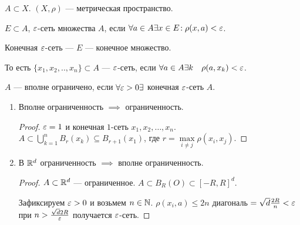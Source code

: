 \begin{definition}
    $A \subset X$.  $(X, \rho)$ --- метрическая пространство.

     $E \subset A$,  $\varepsilon$-сеть множества  $A$, если  $\forall a \in A \exists x \in E\!: \rho(x, a) < \varepsilon$.

     Конечная  $\varepsilon$-сеть ---  $E$ --- конечное множество.

     То есть $\{x_1, x_2,.., x_n\} \subset A$ --- $\varepsilon$-сеть, если  $\forall a \in A \exists k\quad \rho(a, x_k) < \varepsilon$.
\end{definition}
\begin{definition}
    $A$ --- вполне ограничено, если  $\forall \varepsilon > 0 \exists$ конечная $\varepsilon$-сеть  $A$.
\end{definition}

\begin{properties}
    \begin{enumerate}
        \item Вполне ограниченность $\implies$ ограниченность.
             \begin{proof}
                $\varepsilon = 1$ и конечная  $1$-сеть  $x_1, x_2,\ldots,x_n$. $A \subset \bigcup\limits_{k=1}^n B_r(x_k) \subseteq B_{r+1}(x_1)$, где $r = \max\limits_{i \neq j} \rho(x_i, x_j)$.
            \end{proof}
        \item В $\mathbb{R}^d$ ограниченность  $\implies$ вполне ограниченность. 
             \begin{proof}
                $A \subset \mathbb{R}^d$ --- ограниченное.  $A \subset B_R(O) \subset [-R, R]^d$.

                Зафиксируем $\varepsilon > 0$ и возьмем  $n \in \mathbb{N}$.  $\rho(x_i, a) \le 2n$ диагональ $=\sqrt{d}\frac{2R}{n} < \varepsilon$ при $n > \frac{\sqrt{d} 2R}{\varepsilon}$ получается $\varepsilon$-сеть.
            \end{proof}
    \end{enumerate}
\end{properties}

